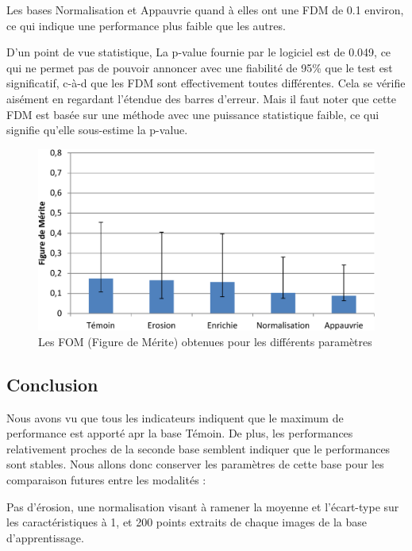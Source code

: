 Les bases Normalisation et Appauvrie quand à elles ont une FDM de 0.1 environ, ce qui indique une performance plus faible que les autres.

D'un point de vue statistique, La p-value fournie par le logiciel est de 0.049, ce qui ne permet pas de pouvoir annoncer avec une fiabilité de 95\% que le test est significatif, c-à-d que les FDM sont effectivement toutes différentes. Cela se vérifie aisément en regardant l'étendue des barres d'erreur. Mais il faut noter que cette FDM est basée sur une méthode avec une puissance statistique faible, ce qui signifie qu'elle sous-estime la p-value.

\begin{figure}[h!]
 \begin{center}
   \includegraphics[width=15cm]{images/FOM_param}
 \end{center}
 \caption{Les FOM (Figure de Mérite) obtenues pour les différents paramètres}
 \label{lab:fom_param}
\end{figure}

\subsection{Conclusion}

Nous avons vu que tous les indicateurs indiquent que le maximum de performance est apporté apr la base Témoin. De plus, les  performances relativement proches de la seconde base semblent indiquer que le performances sont stables. Nous allons donc conserver les paramètres de cette base pour les comparaison futures entre les modalités :

Pas d'érosion, une normalisation visant à ramener la moyenne et l'écart-type sur les caractéristiques à 1, et 200 points extraits de chaque images de la base d'apprentissage.
 

\FloatBarrier

